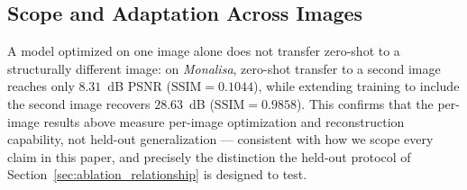 \documentclass[journal]{IEEEtran}
\begin{document}
\begin{table}[t]
\centering
\caption{HVK2D same-set reconstruction across six real image datasets (per-image trained, 80--100 steps, mean $\pm$ std over sampled images).}
\label{tab:sameset_multi_dataset}
\scriptsize
{}
\end{table}

\subsection{Scope and Adaptation Across Images}
\label{sec:no_generalization}
A model optimized on one image alone does not transfer zero-shot to a structurally different image: on \textit{Monalisa}, zero-shot transfer to a second image reaches only $8.31$~dB PSNR ($\mathrm{SSIM}=0.1044$), while extending training to include the second image recovers $28.63$~dB ($\mathrm{SSIM}=0.9858$). This confirms that the per-image results above measure per-image optimization and reconstruction capability, not held-out generalization --- consistent with how we scope every claim in this paper, and precisely the distinction the held-out protocol of Section~\ref{sec:ablation_relationship} is designed to test.
\end{document}
